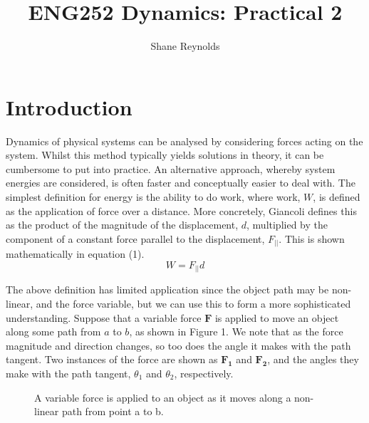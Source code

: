 \documentclass[a4paper]{article}
\begin{document}
\title{ENG252 Dynamics: Practical 2}
\author{Shane Reynolds}
\maketitle

\section{Introduction}
Dynamics of physical systems can be analysed by considering forces acting on the system. Whilst this method typically yields solutions in theory, it can be cumbersome to put into practice. An alternative approach, whereby system energies are considered, is often faster and conceptually easier to deal with. The simplest definition for energy is the ability to do work, where work, $W$, is defined as the application of force over a distance. More concretely, Giancoli \cite{Giancoli:2000} defines this as the product of the magnitude of the displacement, $d$, multiplied by the component of a constant force parallel to the displacement, $F_{||}$. This is shown mathematically in equation (1).
\begin{equation}
W = F_{||}d
\end{equation}

The above definition has limited application since the object path may be non-linear, and the force variable, but we can use this to form a more sophisticated understanding. Suppose that a variable force $\boldsymbol{F}$ is applied to move an object along some path from $a$ to $b$, as shown in Figure 1. We note that as the force magnitude and direction changes, so too does the angle it makes with the path tangent. Two instances of the force are shown as $\boldsymbol{F_1}$ and $\boldsymbol{F_2}$, and the angles they make with the path tangent, $\theta_1$ and $\theta_2$, respectively.
\begin{figure}[h]
	\centering
	\caption{A variable force is applied to an object as it moves along a non-linear path from point a to b.}
\end{figure}
\end{document}
